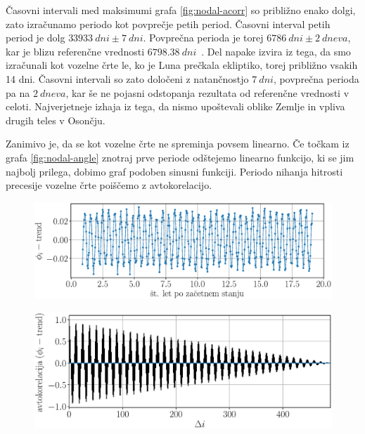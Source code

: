 \documentclass[a4paper,12pt]{article}
\begin{document}
\noindent
Časovni intervali med maksimumi grafa \ref{fig:nodal-acorr} so približno enako
dolgi, zato izračunamo periodo kot povprečje petih period. Časovni 
interval petih period je dolg \linebreak 
$\SI{33933}{dni}\pm\SI{7}{dni}$. Povprečna 
perioda je torej $\SI{6786}{dni}\pm\SI{2}{dneva}$, kar je blizu referenčne 
vrednosti $\SI{6798.38}{dni}$~\cite{nasassd}. Del napake izvira iz tega, da smo 
izračunali kot vozelne črte le, ko je Luna prečkala ekliptiko, torej 
približno vsakih 14 dni. Časovni intervali so zato določeni z natančnostjo 
$\SI{7}{dni}$, povprečna perioda pa na $\SI{2}{dneva}$, kar še ne 
pojasni odstopanja rezultata od referenčne vrednosti v celoti. Najverjetneje 
izhaja iz tega, da nismo upoštevali oblike Zemlje in vpliva drugih teles v 
Osončju.

\noindent
Zanimivo je, da se kot vozelne črte ne spreminja povsem linearno. Če točkam
iz grafa \ref{fig:nodal-angle} znotraj prve periode odštejemo linearno 
funkcijo, ki se jim najbolj prilega, dobimo graf podoben sinusni funkciji.
Periodo nihanja hitrosti precesije vozelne črte poiščemo z avtokorelacijo.

\begin{figure}[h!]
    \centering
    \includegraphics[scale=0.55]{slikep/nodal-angle-detrend.eps}
\end{figure}

\begin{figure}[h!]
    \centering
    \includegraphics[scale=0.55]{slikep/nodal-angle-detrend-acorr.eps}
\end{figure}
\end{document}

